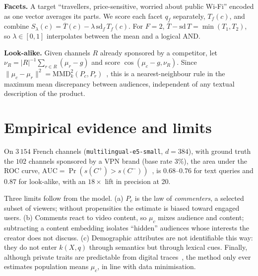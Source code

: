 \documentclass[10pt,twocolumn]{article}
\begin{document}
\textbf{Facets.} A target ``travellers, price-sensitive, worried about public Wi-Fi'' encoded as one vector averages its parts. We score each facet $q_f$ separately, $T_f(c)$, and combine $S_\lambda(c)=\overline{T}(c)-\lambda\,\mathrm{sd}_f\,T_f(c)$. For $F=2$, $\overline T-\mathrm{sd}\,T=\min(T_1,T_2)$, so $\lambda\in[0,1]$ interpolates between the mean and a logical AND.

\textbf{Look-alike.} Given channels $R$ already sponsored by a competitor, let $\nu_R=|R|^{-1}\sum_{r\in R}(\mu_r-g)$ and score $\cos(\mu_c-g,\nu_R)$. Since $\|\mu_c-\mu_r\|^2=\mathrm{MMD}_k^2(P_c,P_r)$~\cite{gretton2012}, this is a nearest-neighbour rule in the maximum mean discrepancy between audiences, independent of any textual description of the product.

\section{Empirical evidence and limits}
On $3\,154$ French channels (\texttt{multilingual-e5-small}, $d=384$), with ground truth the $102$ channels sponsored by a VPN brand (base rate $3\%$), the area under the ROC curve, $\mathrm{AUC}=\Pr(s(C^+)>s(C^-))$~\cite{hanley1982}, is $0.68$--$0.76$ for text queries and $0.87$ for look-alike, with an $18\times$ lift in precision at 20.

Three limits follow from the model. (a) $P_c$ is the law of \emph{commenters}, a selected subset of viewers; without propensities the estimate is biased toward engaged users. (b) Comments react to video content, so $\mu_c$ mixes audience and content; subtracting a content embedding isolates ``hidden'' audiences whose interests the creator does not discuss. (c) Demographic attributes are not identifiable this way: they do not enter $k(X,q)$ through semantics but through lexical cues. Finally, although private traits are predictable from digital traces~\cite{kosinski2013}, the method only ever estimates population means $\mu_c$, in line with data minimisation.
\end{document}
